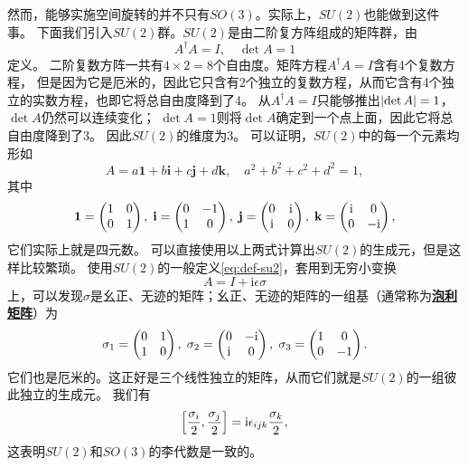 \documentclass[hyperref, UTF8, a4paper]{ctexart}
\newcommand*{\ii}{\mathrm{i}}
\newcommand{\concept}[1]{\underline{\textbf{#1}}}
\begin{document}
然而，能够实施空间旋转的并不只有$SO(3)$。实际上，$SU(2)$也能做到这件事。
下面我们引入$SU(2)$群。$SU(2)$是由二阶复方阵组成的矩阵群，由
\begin{equation}
    A^\dagger A = I, \quad \det A = 1
    \label{eq:def-su2}
\end{equation}
定义。
二阶复数方阵一共有$4 \times 2 = 8$个自由度。矩阵方程$A^\dagger A = I$含有4个复数方程，
但是因为它是厄米的，因此它只含有2个独立的复数方程，从而它含有4个独立的实数方程，也即它将总自由度降到了4。
从$A^\dagger A = I$只能够推出$\abs{\det A} = 1$，$\det A$仍然可以连续变化；
$\det A = 1$则将$\det A$确定到一个点上面，因此它将总自由度降到了3。
因此$SU(2)$的维度为3。
可以证明，$SU(2)$中的每一个元素均形如
\begin{equation}
    A = a \mathbf{1} + b \mathbf{i} + c \mathbf{j} + d \mathbf{k}, \quad a^2 + b^2 + c^2 + d^2 = 1,
    \label{eq:su2-expression}
\end{equation}
其中
\begin{equation}
    \mathbf{1} = \pmqty{1 & 0 \\ 0 & 1}, \; \mathbf{i} = \pmqty{0 & -1 \\ 1 & 0}, \; 
    \mathbf{j} = \pmqty{0 & \ii \\ \ii & 0}, \; \mathbf{k} = \pmqty{\ii & 0 \\ 0 & -\ii},
    \label{eq:quad-basis}
\end{equation}
它们实际上就是四元数。
可以直接使用以上两式计算出$SU(2)$的生成元，但是这样比较繁琐。
使用$SU(2)$的一般定义\eqref{eq:def-su2}，套用到无穷小变换
\[
    A = I + \ii \epsilon \sigma
\]
上，可以发现$\sigma$是幺正、无迹的矩阵；幺正、无迹的矩阵的一组基（通常称为\concept{泡利矩阵}）为
\begin{equation}
    \sigma_1 = \pmqty{0 & 1 \\ 1 & 0}, \; \sigma_2 = \pmqty{0 & -\ii \\ \ii & 0}, \; \sigma_3 = \pmqty{1 & 0 \\ 0 & -1}.
    \label{eq:sigma-matrix}
\end{equation}
它们也是厄米的。这正好是三个线性独立的矩阵，从而它们就是$SU(2)$的一组彼此独立的生成元。
我们有
\begin{equation}
    \comm{\frac{\sigma_i}{2}}{\frac{\sigma_j}{2}} = \ii \epsilon_{ijk} \frac{\sigma_k}{2},
\end{equation}
这表明$SU(2)$和$SO(3)$的李代数是一致的。
\end{document}
